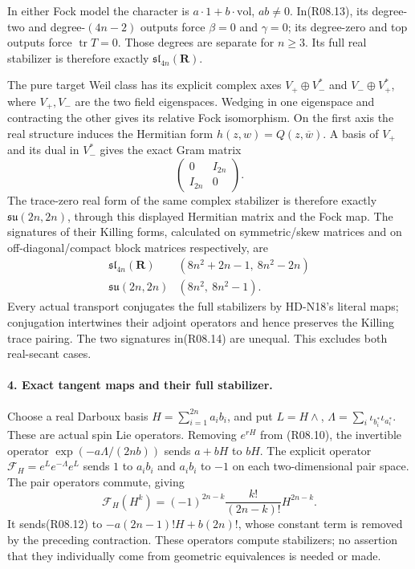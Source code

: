 In either Fock model the character is $a\cdot1+b\cdot\mathrm{vol}$,
$ab\ne0$. In(R08.13), its degree-two and degree-$(4n-2)$
outputs force $\beta=0$ and $\gamma=0$; its degree-zero and
top outputs force $\operatorname{tr}T=0$. Those degrees are
separate for $n\ge3$. Its full real stabilizer is therefore
exactly $\mathfrak{sl}_{4n}(\mathbf R)$.

The pure target Weil class has its explicit complex axes
$V_+\oplus V_-^*$ and $V_-\oplus V_+^*$, where
$V_+,V_-$ are the two field eigenspaces. Wedging in one
eigenspace and contracting the other gives its relative Fock
isomorphism. On the first axis the real structure induces the
Hermitian form $h(z,w)=Q(z,\overline w)$. A basis of $V_+$
and its dual in $V_-^*$ gives the exact Gram matrix
\[
                           \begin{pmatrix}0&I_{2n}\\I_{2n}&0\end{pmatrix}.
\]
The trace-zero real form of the same complex stabilizer is
therefore exactly $\mathfrak{su}(2n,2n)$, through this displayed
Hermitian matrix and the Fock map. The signatures of their
Killing forms, calculated on symmetric/skew matrices and on
off-diagonal/compact block matrices respectively, are
\[
 \begin{array}{c|c}
 \mathfrak{sl}_{4n}(\mathbf R)&
       (8n^2+2n-1,\ 8n^2-2n)\\
 \mathfrak{su}(2n,2n)&(8n^2,\ 8n^2-1).
 \end{array}                                                 \tag{R08.14}
\]
Every actual transport conjugates the full stabilizers by
HD-N18's literal maps; conjugation intertwines their adjoint
operators and hence preserves the Killing trace pairing.
The two signatures in(R08.14) are unequal. This excludes
both real-secant cases.

\paragraph{4. Exact tangent maps and their full stabilizer.}
Choose a real Darboux basis $H=\sum_{i=1}^{2n}a_i b_i$,
and put $L=H\wedge$, $\Lambda=\sum_i\iota_{b_i^*}\iota_{a_i^*}$.
These are actual spin Lie operators. Removing $e^{rH}$ from
(R08.10), the invertible operator
$\exp(-a\Lambda/(2nb))$ sends $a+bH$ to $bH$.
The explicit operator $\mathcal F_H=e^L e^{-\Lambda}e^L$
sends $1$ to $a_i b_i$ and $a_i b_i$ to $-1$ on each
two-dimensional pair space. The pair operators commute, giving
\[
       \mathcal F_H(H^k)=(-1)^{2n-k}
                         \frac{k!}{(2n-k)!}H^{2n-k}.          \tag{R08.15}
\]
It sends(R08.12) to
$-a(2n-1)!H+b(2n)!$, whose constant term is removed by
the preceding contraction. These operators compute stabilizers;
no assertion that they individually come from geometric
equivalences is needed or made.

